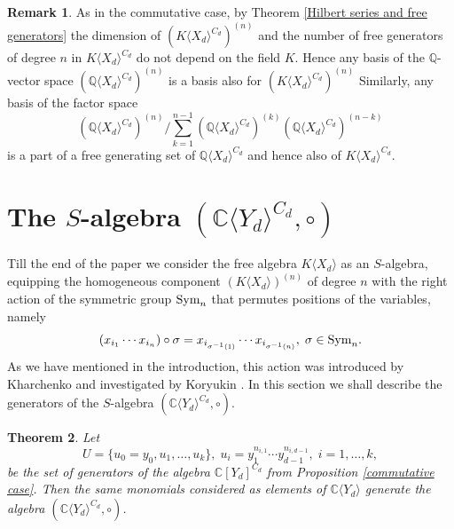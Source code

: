 \documentclass{amsart}
\newtheorem{theorem}{Theorem}[section]
\theoremstyle{definition}
\newtheorem{remark}[theorem]{Remark}
\newcommand{\C}{{\mathbb{C}}}
\begin{document}
\begin{remark}\label{different fields}
As in the commutative case, by Theorem \ref{Hilbert series and free generators} the dimension of $(K\langle X_d\rangle^{C_d})^{(n)}$
and the number of free generators of degree $n$ in $K\langle X_d\rangle^{C_d}$ do not depend on the field $K$.
Hence any basis of the $\mathbb Q$-vector space $\left({\mathbb Q}\langle X_d\rangle^{C_d}\right)^{(n)}$ is a basis also for $\left(K\langle X_d\rangle^{C_d}\right)^{(n)}$
Similarly, any basis of the factor space
\[
\left({\mathbb Q}\langle X_d\rangle^{C_d}\right)^{(n)}/\sum_{k=1}^{n-1}\left({\mathbb Q}\langle X_d\rangle^{C_d}\right)^{(k)}\left({\mathbb Q}\langle X_d\rangle^{C_d}\right)^{(n-k)}
\]
is a part of a free generating set of ${\mathbb Q}\langle X_d\rangle^{C_d}$ and hence also of $K\langle X_d\rangle^{C_d}$.
\end{remark}

\section{\textbf{The $S$-algebra} $(\C \langle Y_d \rangle^{C_d},\circ)$}
Till the end of the paper we consider the free algebra $K\langle X_d\rangle$ as an $S$-algebra,
equipping the homogeneous component $(K\langle X_d\rangle)^{(n)}$ of degree $n$ with the right action of the symmetric group $\text{\rm Sym}_n$
that permutes positions of the variables, namely
\[
(x_{i_1}\cdots x_{i_n})\circ \sigma=x_{i_{\sigma^{-1}(1)}}\cdots x_{i_{\sigma^{-1}(n)}},\;\sigma\in \text{\rm Sym}_n.
\]
As we have mentioned in the introduction, this action was introduced by Kharchenko \cite{Kh2} and investigated by Koryukin \cite{Kor}.
In this section we shall describe the generators of the $S$-algebra $(\C \langle Y_d \rangle^{C_d},\circ)$.

\begin{theorem}\label{cyclic S-invariants}
Let
\[
U=\{u_0=y_0,u_1,\ldots,u_k\},\;u_i=y_1^{n_{i,1}}\cdots y_{d-1}^{n_{i,d-1}},\;i=1,\ldots,k,
\]
be the set of generators of the algebra ${\mathbb C}[Y_d]^{C_d}$ from Proposition \ref{commutative case}.
Then the same monomials considered as elements of ${\mathbb C}\langle Y_d\rangle$ generate the algebra
$({\mathbb C}\langle Y_d\rangle^{C_d},\circ)$.
\end{theorem}
\end{document}
